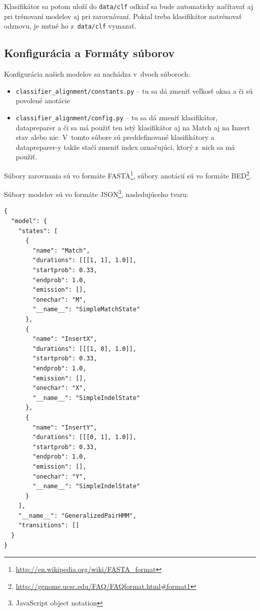 Klasifikátor sa potom uloží do {\tt data/clf} odkiaľ sa bude automaticky načítavať aj pri trénovaní modelov aj pri zarovnávaní. Pokiaľ treba klasifikátor natrénovať odznovu, je nutné ho z~{\tt data/clf} vymazať.

\subsection{Konfigurácia a Formáty súborov}
Konfigurácia našich modelov sa nachádza v~dvoch súboroch:
\begin{itemize}
    \item {\tt classifier\_alignment/constants.py} -- tu sa dá zmeniť veľkosť okna a či sú povolené anotácie
    \item {\tt classifier\_alignment/config.py} -- tu sa dá zmeniť klasifikátor, datapreparer a  či sa má použiť ten istý klasifikátor aj na Match aj na Inzert stav alebo nie. V~tomto súbore sú preddefinované klasifikátory a datapreparer-y takže stačí zmeniť index označujúci, ktorý z~nich sa má použiť.
\end{itemize}

Súbory zarovnania sú vo formáte FASTA\footnote{\url{http://en.wikipedia.org/wiki/FASTA_format}}, súbory anotácií sú vo formáte BED\footnote{\url{http://genome.ucsc.edu/FAQ/FAQformat.html\#format1}}.

Súbory modelov sú vo formáte JSON\footnote{JavaScript object notation}, nasledujúceho tvaru:

\begin{lstlisting}
{
  "model": {
    "states": [
      {
        "name": "Match",
        "durations": [[[1, 1], 1.0]],
        "startprob": 0.33,
        "endprob": 1.0,
        "emission": [],
        "onechar": "M",
        "__name__": "SimpleMatchState"
      },
      {
        "name": "InsertX",
        "durations": [[[1, 0], 1.0]],
        "startprob": 0.33,
        "endprob": 1.0,
        "emission": [],
        "onechar": "X",
        "__name__": "SimpleIndelState"
      },
      {
        "name": "InsertY",
        "durations": [[[0, 1], 1.0]],
        "startprob": 0.33,
        "endprob": 1.0,
        "emission": [],
        "onechar": "Y",
        "__name__": "SimpleIndelState"
      }
    ],
    "__name__": "GeneralizedPairHMM",
    "transitions": []
  }
}
\end{lstlisting}


